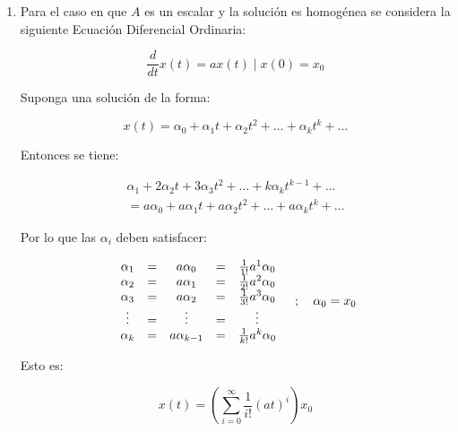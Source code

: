     \begin{enumerate}

    \item Para el caso en que $A$ es un escalar y la solución es homogénea se considera la siguiente Ecuación Diferencial Ordinaria:

        \begin{equation}
            \frac{d}{dt} x(t) = a x(t) \mid x(0) = x_0
        \end{equation}

        Suponga una solución de la forma:

        \begin{equation}
            x(t) = \alpha_0 + \alpha_1 t + \alpha_2 t^2 + \dots + \alpha_k t^k + \dots
        \end{equation}

        Entonces se tiene:

        \begin{multline}
            \alpha_1 + 2 \alpha_2 t + 3 \alpha_3 t^2 + \dots + k \alpha_k t^{k-1} + \dots \\ = a \alpha_0 + a \alpha_1 t + a \alpha_2 t^2 + \dots + a \alpha_k t^k + \dots \nonumber
        \end{multline}

        Por lo que las $\alpha_{i}$ deben satisfacer:

        \begin{equation}
            \begin{array}{c c c c c}
            \alpha_1 & = & a \alpha_0     & = & \frac{1}{1!} a^1 \alpha_0 \\
            \alpha_2 & = & a \alpha_1     & = & \frac{1}{2!} a^2 \alpha_0 \\
            \alpha_3 & = & a \alpha_2     & = & \frac{1}{3!} a^3 \alpha_0 \\
            \vdots   & = & \vdots         & = & \vdots                    \\
            \alpha_k & = & a \alpha_{k-1} & = & \frac{1}{k!} a^k \alpha_0 \\
            \end{array} \quad ; \quad \alpha_0 = x_0
        \end{equation}

        Esto es:

        \begin{equation}
            x(t) = \left( \sum\limits_{i = 0}^{\infty} \frac{1}{i!} (a t)^i \right) x_0 \nonumber
        \end{equation}


\end{enumerate}
